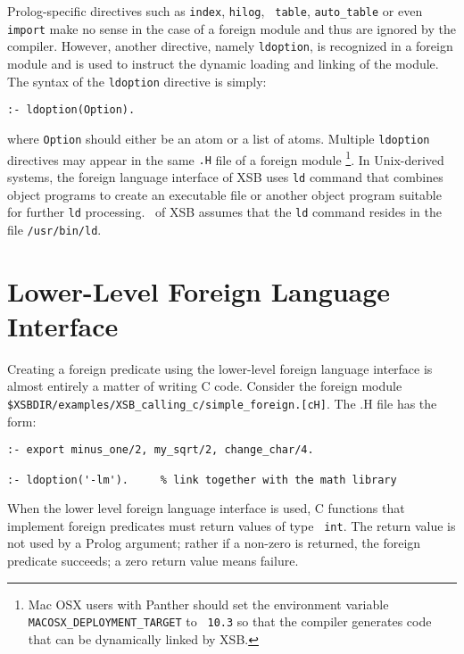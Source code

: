 Prolog-specific directives such as {\tt index}, {\tt hilog}, {\tt
  table}, {\tt auto\_table} or even {\tt import} make no sense in the
case of a foreign module and thus are ignored by the compiler.
However, another directive, namely {\tt ldoption}, is recognized in a
foreign module and is used to instruct the dynamic loading and linking
of the module.  The syntax of the {\tt ldoption} directive is simply:
\begin{center}
{\tt  :- ldoption(Option).    }
\end{center}
where {\tt Option} should either be an atom or a list of atoms.
Multiple {\tt ldoption} directives may appear in the same {\tt .H}
file of a foreign module \footnote{Mac OSX users with Panther should
  set the environment variable {\tt MACOSX\_DEPLOYMENT\_TARGET} to {\tt
    10.3} so that the compiler generates code that can be dynamically
  linked by XSB.}.
In Unix-derived systems, the foreign language interface of XSB uses
{\tt ld} command that combines object programs to create an executable
file or another object program suitable for further {\tt ld}
processing. \version\ of XSB assumes that the {\tt ld} command resides
in the file {\tt /usr/bin/ld}.

\section{Lower-Level Foreign Language Interface}

Creating a foreign predicate using the lower-level foreign language
interface is almost entirely a matter of writing C code.  Consider the
foreign module {\tt
  \$XSBDIR/examples/XSB\_calling\_c/simple\_foreign.[cH]}.  The .H file
has the form: 

\begin{verbatim}
:- export minus_one/2, my_sqrt/2, change_char/4.

:- ldoption('-lm').     % link together with the math library
\end{verbatim}

When the lower level foreign language interface is used, C functions
that implement foreign predicates must return values of type {\tt
  int}.  The return value is not used by a Prolog argument; rather if
a non-zero is returned, the foreign predicate succeeds; a zero return
value means failure.

